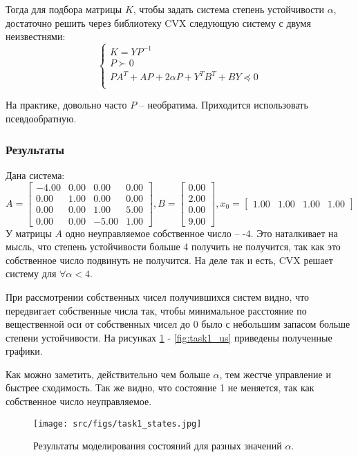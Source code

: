 Тогда для подбора матрицы \(K\), чтобы задать система степень устойчивости \(\alpha\), достаточно решить через библиотеку CVX следующую систему с двумя неизвестнями:
\[
        \begin{cases}
                K = YP^{-1}\\
                P \succ 0 \\
                PA^T + AP + 2 \alpha P + Y^T B^T + BY \preccurlyeq 0  \\
        \end{cases} 
\]

На практике, довольно часто \(P\) -- необратима. Приходится использовать псевдообратную.

\subsubsection{Результаты}
Дана система:
\[A = \begin{bmatrix}
        -4.00 &  0.00 &  0.00 &  0.00\\
         0.00 &  1.00 &  0.00 &  0.00\\
         0.00 &  0.00 &  1.00 &  5.00\\
         0.00 &  0.00 & -5.00 &  1.00
       \end{bmatrix},
       B = \begin{bmatrix}
        0.00\\
        2.00\\
        0.00\\
        9.00
      \end{bmatrix},
      x_0 = \begin{bmatrix}
        1.00 &  1.00 &  1.00 &  1.00
      \end{bmatrix}
       \]
У матрицы \(A\) одно неуправляемое собственное число -- -4.
Это наталкивает на мысль, что степень устойчивости больше 4 получить не получится, так как это собственное число подвинуть не получится. 
На деле так и есть, CVX решает систему для \(\forall \alpha < 4\).

При рассмотрении собственных чисел получившихся систем видно, что передвигает собственные числа так, чтобы минимальное расстояние по вещественной оси от собственных чисел до 0 было с небольшим запасом больше степени устойчивости. 
На рисунках \ref{fig:task1_states} - \ref*{fig:task1_us} приведены полученные графики.

Как можно заметить, действительно чем больше \(\alpha\), тем жестче управление и быстрее сходимость. Так же видно, что состояние 1 не меняется, так как собственное число неуправляемое.
\begin{figure}[ht!]
        \centering
        \texttt{[image: src/figs/task1\_states.jpg]}
        \caption{Результаты моделирования состояний для разных значений \(\alpha\).}
        \label{fig:task1_states}
\end{figure}


